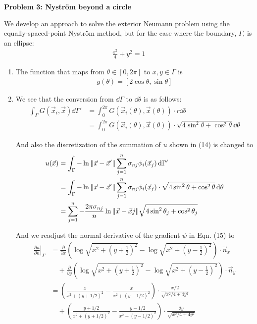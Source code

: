 \textbf{Problem 3: Nyström beyond a circle}

We develop an approach to solve the exterior Neumann problem using the equally-spaced-point Nyström method, but for the case where the boundary, $\Gamma$, is an ellipse:
\begin{align}
    \frac{x^2}{4}+ y^2 = 1
\end{align}

\begin{enumerate}[label=(\alph*),leftmargin=*,itemsep=0mm]
    
    \item The function that maps from $\theta\in[0,2\pi]$ to $x,y\in\Gamma$ is
    \begin{align}
        g(\theta) = [2\cos\theta,\sin\theta]
    \end{align}
    
    \item We see that the conversion from $\dd{\Gamma}$ to $\dd{\theta}$ is as follows:
    \begin{align}
        \int_\Gamma G(\vec{x}_i,\vec{x}) \dd{\Gamma'}
        &= \int_0^{2\pi} G(\vec{x}_i(\theta),\vec{x}(\theta)) \cdot r \dd{\theta} \nonumber \\
        &= \int_0^{2\pi} G(\vec{x}_i(\theta),\vec{x}(\theta)) \cdot \sqrt{4\sin^2\theta + \cos^2\theta} \dd{\theta}
    \end{align}
    
    And also the discretization of the summation of $u$ shown in (14) is changed to
    \begin{align}
        u(\vec{x})
        &= \int_\Gamma -\ln \norm{\vec{x}-\vec{x}'} \sum_{j=1}^n \sigma_{nj} \phi_i(\vec{x}_j) \dd{\Gamma'} \nonumber \\
        &= \int_\Gamma -\ln \norm{\vec{x}-\vec{x}'} \sum_{j=1}^n \sigma_{nj} \phi_i(\vec{x}_j) 
        \cdot \sqrt{4\sin^2\theta + \cos^2\theta} \dd{\theta} \nonumber \\
        &= \sum_{j=1}^n -\frac{2\pi\sigma_{nj}}{n} \ln \norm{\vec{x}-\vec{x}j}
        \sqrt{4\sin^2\theta_j + \cos^2\theta_j}
    \end{align}
    
    And we readjust the normal derivative of the gradient $\psi$ in Eqn. (15) to
    \begin{align}
        \left. \frac{\partial{u}}{\partial{n}} \right|_\Gamma
        &= \frac{\partial}{\partial{x}} \left( \log \sqrt{x^2 + \left( y + \frac{1}{2} \right)^2}
        - \log \sqrt{x^2 + \left( y - \frac{1}{2} \right)^2} \right) \cdot \vec{n}_x \nonumber \\
        &\quad + \frac{\partial}{\partial{y}} \left( \log \sqrt{x^2 + \left( y + \frac{1}{2} \right)^2}
        - \log \sqrt{x^2 + \left( y - \frac{1}{2} \right)^2} \right) \cdot \vec{n}_y \nonumber \\
        &= \left( \frac{x}{x^2+(y+1/2)^2} - \frac{x}{x^2+(y-1/2)^2} \right)
        \cdot \frac{x/2}{\sqrt{x^2/4+4y^2}} \nonumber \\
        &\quad + \left( \frac{y+1/2}{x^2+(y+1/2)^2} - \frac{y-1/2}{x^2+(y-1/2)^2} \right)
        \cdot \frac{2y}{\sqrt{x^2/4+4y^2}}
    \end{align} 
    

\end{enumerate}
